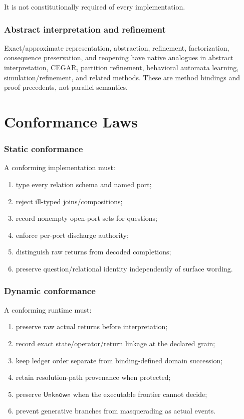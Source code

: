\documentclass[11pt,oneside]{article}
\begin{document}
It is not constitutionally required of every implementation.

\section{Abstract interpretation and refinement}

Exact/approximate representation, abstraction, refinement, factorization, consequence preservation, and reopening have native analogues in abstract interpretation, CEGAR, partition refinement, behavioral automata learning, simulation/refinement, and related methods.  These are method bindings and proof precedents, not parallel semantics.

\part{Conformance Laws}

\section{Static conformance}

A conforming implementation must:
\begin{enumerate}
\item type every relation schema and named port;
\item reject ill-typed joins/compositions;
\item record nonempty open-port sets for questions;
\item enforce per-port discharge authority;
\item distinguish raw returns from decoded completions;
\item preserve question/relational identity independently of surface wording.
\end{enumerate}

\section{Dynamic conformance}

A conforming runtime must:
\begin{enumerate}
\item preserve raw actual returns before interpretation;
\item record exact state/operator/return linkage at the declared grain;
\item keep ledger order separate from binding-defined domain succession;
\item retain resolution-path provenance when protected;
\item preserve \(\mathsf{Unknown}\) when the executable frontier cannot decide;
\item prevent generative branches from masquerading as actual events.
\end{enumerate}
\end{document}
